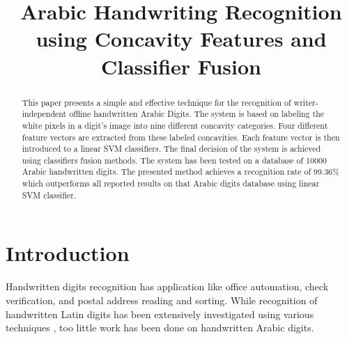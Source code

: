 \documentclass[conference]{IEEEtran}
\begin{document}
\title{Arabic Handwriting Recognition using Concavity Features and Classifier Fusion}

\author{
\and
{}
}

\maketitle


\begin{abstract}

This paper presents a simple and  effective technique for the recognition of writer-independent offline handwritten Arabic Digits. The system is based on labeling the white pixels in a   digit's  image into nine different concavity categories. Four different feature vectors are extracted from these labeled concavities. Each feature vector is then introduced to a linear SVM classifiers. The final decision of the system is achieved using classifiers fusion methods. The system has been tested on a database of 10000 Arabic handwritten digits. The presented method achieves a recognition rate of 99.36\% which outperforms all reported results on that Arabic digits database using linear SVM classifier.

\end{abstract}

\IEEEpeerreviewmaketitle

\section{Introduction}

 Handwritten digits recognition has application like office automation, check verification, and postal address reading and sorting. While recognition of handwritten Latin digits has been extensively investigated using various techniques \cite{FE4Liu2003}, too little work has been done on handwritten Arabic digits.
\end{document}
